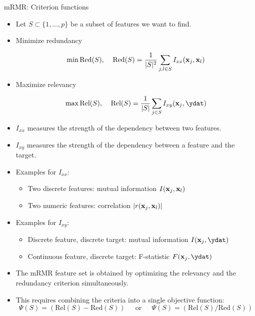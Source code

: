 \documentclass[11pt,compress,t,notes=noshow, xcolor=table]{beamer}
\begin{document}
  \begin{vbframe}{\MakeLowercase{M}RMR: Criterion functions}
  \begin{itemize}
  \item Let $S \subset \{1, \dots, p \}$ be a subset of features we want to find.
  \item Minimize redundancy

  $$\min \text{Red}(S), \;\;\;\; \text{Red}(S) = \frac{1}{|S|^2} \sum_{j, l \in S} I_{xx}(\mathbf{x}_j, \mathbf{x}_l)$$

  \item Maximize relevancy

  $$\max \text{Rel}(S), \;\;\;\; \text{Rel}(S) = \frac{1}{|S|} \sum_{j \in S} I_{xy}(\xj, \ydat)$$

  \item $I_{xx}$ measures the strength of the dependency between two features.
  \item $I_{xy}$ measures the strength of the dependency between a feature and the target.
  \end{itemize}

  \framebreak

  \begin{itemize}

  \lz

  \item Examples for $I_{xx}$:
    \begin{itemize}
    \item Two discrete features: mutual information $I(\mathbf{x}_j, \mathbf{x}_l)$
    \item Two numeric features: correlation $|r(\mathbf{x}_j, \mathbf{x}_l)|$
    \end{itemize}

  \lz

  \item Examples for $I_{xy}$:
    \begin{itemize}
    \item Discrete feature, discrete target: mutual information $I(\xj, \ydat)$
    \item Continuous feature, discrete target: F-statistic $F(\xj, \ydat)$
    \end{itemize}
  \end{itemize}


  \framebreak

  \begin{itemize}
  \item The mRMR feature set is obtained by optimizing the relevancy and the redundancy criterion simultaneously.
  \item This requires combining the criteria into a single objective function:
  $$\Psi(S) = (\text{Rel}(S) - \text{Red}(S)) \;\;\;\; \text{ or } \;\;\;\; \Psi(S) = (\text{Rel}(S)/\text{Red}(S))$$


\end{itemize}
\end{vbframe}
\end{document}
